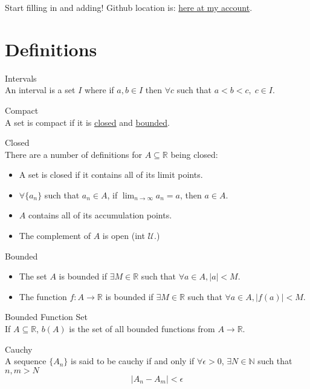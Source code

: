 \documentclass{article}
\newcommand{\natnums}{{\mathbb N}}
\begin{document}
Start filling in and adding!  Github location is: \href{http://github.com/ottocode/realAnalysis}{here at my account}.

\section{Definitions}
\begin{description}
\item Intervals \label{interval}\hfill \\
	An interval is a set \(I\) where if \(a,b\in I\) then \(\forall c\) such that \(a<b<c,\; c\in I\).

\item Compact \label{compact}\hfill \\
	A set is compact if it is \hyperref[closed]{closed} and \hyperref[bounded]{bounded}.

\item Closed \label{closed}\hfill \\
There are a number of definitions for \(A\subseteq \mathbb{R}\) being closed:
\begin{itemize}
\item A set is closed if it contains all of its limit points.
\item \(\forall \{a_n\} \) such that \(a_n \in A\), if \(\lim_{n\to\infty}a_n=a\), then \(a\in A.\)
\item \(A\) contains all of its accumulation points.
\item The complement of \(A\) is open (int \(\mathcal{U}\).)
\end{itemize}

\item Bounded \label{bounded}\hfill \\
\begin{itemize}
\item The set \(A\) is bounded if \(\exists M\in\mathbb{R}\) such that \(\forall a\in A, |a|<M.\)
\item The function \(f:A\to \mathbb{R}\) is bounded if \(\exists M\in\mathbb{R}\) such that \(\forall a\in A, |f(a)|<M.\)
\end{itemize}

\item Bounded Function Set \label{setofboundedfunctions}\hfill \\
If \(A\subseteq\mathbb{R}\), \(b(A)\) is the set of all bounded functions from \(A\to\mathbb{R}\).

\item Cauchy \label{cauchy}\hfill\\
A sequence $\{A_n\}$ is said to be cauchy if and only if $\forall \epsilon>0$, $\exists N\in \natnums$ such that $n,m>N$ $$|A_n-A_m|<\epsilon$$


\end{description}
\end{document}
